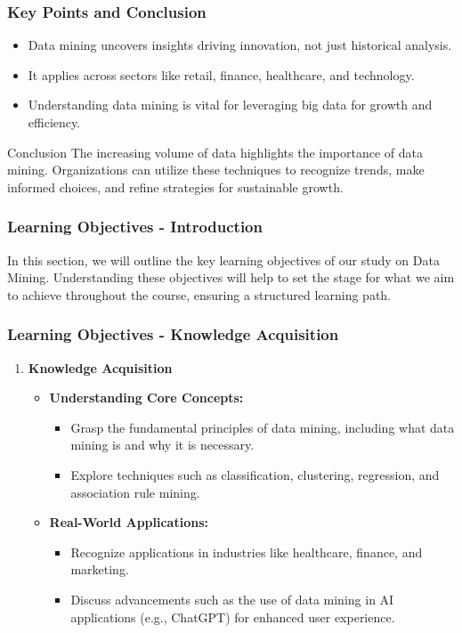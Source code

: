 \documentclass[aspectratio=169]{beamer}
\begin{document}
\begin{frame}[fragile]
    \frametitle{Key Points and Conclusion}
    \begin{itemize}
        \item Data mining uncovers insights driving innovation, not just historical analysis.
        \item It applies across sectors like retail, finance, healthcare, and technology.
        \item Understanding data mining is vital for leveraging big data for growth and efficiency.
    \end{itemize}
    \begin{block}{Conclusion}
        The increasing volume of data highlights the importance of data mining. Organizations can utilize these techniques to recognize trends, make informed choices, and refine strategies for sustainable growth.
    \end{block}
\end{frame}

\begin{frame}[fragile]
    \frametitle{Learning Objectives - Introduction}
    In this section, we will outline the key learning objectives of our study on Data Mining. Understanding these objectives will help to set the stage for what we aim to achieve throughout the course, ensuring a structured learning path.
\end{frame}

\begin{frame}[fragile]
    \frametitle{Learning Objectives - Knowledge Acquisition}
    \begin{enumerate}
        \item \textbf{Knowledge Acquisition}
        \begin{itemize}
            \item \textbf{Understanding Core Concepts:}
            \begin{itemize}
                \item Grasp the fundamental principles of data mining, including what data mining is and why it is necessary.
                \item Explore techniques such as classification, clustering, regression, and association rule mining.
            \end{itemize}
            \item \textbf{Real-World Applications:}
            \begin{itemize}
                \item Recognize applications in industries like healthcare, finance, and marketing.
                \item Discuss advancements such as the use of data mining in AI applications (e.g., ChatGPT) for enhanced user experience.
            \end{itemize}
        \end{itemize}
    \end{enumerate}
\end{frame}
\end{document}

